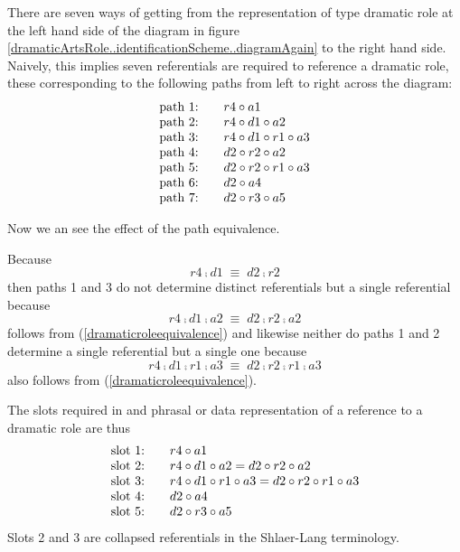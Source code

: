 There are seven ways of getting from the representation of type dramatic role at the left hand side of the diagram in figure \ref{dramaticArtsRole..identificationScheme..diagramAgain} to the right hand side. Naively, this implies seven referentials are required to reference a dramatic role, these corresponding to the following paths from left to right across the diagram:
\begin{displaymath}
\begin{array}{l c l}
\text{path 1:} &  & r4 \circ a1 \\
\text{path 2:} & & r4 \circ d1 \circ a2 \\
\text{path 3:} & & r4 \circ d1 \circ r1 \circ a3 \\
\text{path 4:} &  & d2 \circ r2 \circ a2 \\
\text{path 5:} &  & d2 \circ r2 \circ r1 \circ a3 \\
\text{path 6:} &  & d2 \circ a4 \\
\text{path 7:} &  & d2 \circ r3 \circ a5
\end{array}
\end{displaymath}

Now we an see the effect of the path equivalence.

Because 
\begin{equation}
\label{dramaticroleequivalence}
r4 \comp d1 \;\equiv\; d2 \comp r2
\end{equation}
then paths 1 and 3 do not determine distinct referentials but a single referential because
\begin{equation}
r4 \comp d1 \comp a2 \;\equiv\; d2 \comp r2 \comp a2
\end{equation} 
follows from (\ref{dramaticroleequivalence})
and likewise neither do paths 1 and 2 determine a single referential but a single one because
\begin{equation}
r4 \comp d1 \comp r1 \comp a3 \;\equiv\; d2 \comp r2 \comp r1 \comp a3
\end{equation}
also follows from (\ref{dramaticroleequivalence}).

The slots required in and phrasal or data representation of a reference to a dramatic role are thus
\begin{displaymath}
\begin{array}{l c l}
\text{slot 1:} &  & r4 \circ a1 \\
\text{slot 2:} &  & r4 \circ d1 \circ a2 = d2 \circ r2 \circ a2 \\
\text{slot 3:} &  & r4 \circ d1 \circ r1 \circ a3 = d2 \circ r2 \circ r1 \circ a3 \\
\text{slot 4:} &  & d2 \circ a4 \\
\text{slot 5:} &  & d2 \circ r3 \circ a5
\end{array}
\end{displaymath}
Slots 2 and  3 are collapsed referentials in the Shlaer-Lang terminology.

